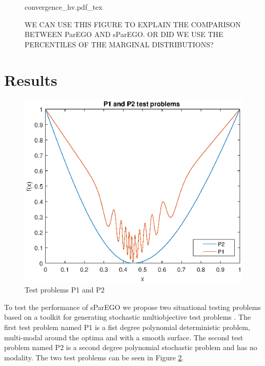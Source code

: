 \documentclass[10pt]{llncs}
\begin{document}
\begin{figure}
\centering
\def\svgwidth{0.45\textwidth}
{convergence_hv.pdf_tex}
\caption{WE CAN USE THIS FIGURE TO EXPLAIN THE COMPARISON BETWEEN ParEGO AND sParEGO. OR DID WE USE THE PERCENTILES OF THE MARGINAL DISTRIBUTIONS?}
\label{fig:convergence}
\end{figure}


\section{Results}
\label{sec:results}

\begin{figure}
\vspace{-100pt}
\begin{center}
\includegraphics[scale=0.45]{testproblems}
\end{center}
\vspace{-20pt}
\caption{Test problems P1 and P2}
\vspace{-20pt}
\label{fig:TestProblems}
\end{figure}

To test the performance of sParEGO we propose two situational testing problems based on a toolkit for generating stochastic multiobjective test problems \cite{Salomon2016Toolkit}. The first test problem named P1 is a fist degree polynomial deterministic problem, multi-modal around the optima and with a smooth surface. The second test problem named P2 is a second degree polynomial stochastic problem and has no modality. The two test problems can be seen in Figure \ref{fig:TestProblems}.  
\end{document}
